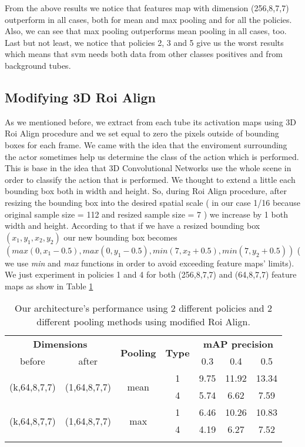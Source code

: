 From the above results we notice that features map with dimension (256,8,7,7) outperform in all cases, both for mean and max pooling and
for all the policies. Also, we can see that max pooling outperforms mean pooling in all cases, too. Last but not least, we notice that policies
2, 3 and 5 give us the worst results which means that svm needs both data from other classes positives and from background tubes. 

\subsection{Modifying 3D Roi Align}
As we mentioned before, we extract from each tube its activation maps using 3D Roi Align procedure and we set equal to zero the pixels outside
of bounding boxes for each frame. We came with the idea that the enviroment surrounding the actor sometimes help us determine the class
of the action which is performed. This is base in the idea that 3D Convolutional Networks use the whole scene in order to classify the action
that is performed. We thought to extend a little each bounding box both in width and height. So, during Roi Align procedure, after resizing
the bounding box into the desired spatial scale  ( in our case 1/16 because original sample size = 112 and resized sample size = 7 )
we increase by 1 both width and height. According to that if we have a resized bounding box $( x_1,y_1,x_2,y_2) $ our new bounding box becomes
$ (max(0,x_1-0.5),max(0,y_1-0.5),min(7,x_2+0.5),min(7,y_2+0.5)) $ ( we use \textit{ min} and \textit{max} functions in order to avoid exceeding feature maps' limits).
We just experiment in policies 1 and 4 for both (256,8,7,7) and (64,8,7,7) feature maps as show in  Table \ref{table:svm_mod_roialign}


\begin{center}
\begin{longtable}{||c | c | c| c||c c c||}

  \hline
  \multicolumn{2}{||c|}{\textbf{Dimensions}} & \multirow{2}{*}{ \textbf{Pooling}} &\multirow{2}{*}{\textbf{Type}} & \multicolumn{3}{|c||}{\textbf{mAP precision}}\\

   before & after &  {} & {} &  0.3 &  0.4 & 0.5 \\
 \hline   \hline
 \multirow{2}{*}{(k,64,8,7,7)} & \multirow{2}{*}{(1,64,8,7,7)} & \multirow{2}{*}{mean}  & 1 & 9.75 & 11.92 & 13.34 \\
  \cline{4-7}
  {} & {} & {} & 4 &  5.74 &6.62 & 7.59 \\
  \hline
 \multirow{2}{*}{(k,64,8,7,7)} & \multirow{2}{*}{(1,64,8,7,7)} & \multirow{2}{*}{max}  & 1 &  6.46 & 10.26 & 10.83 \\
    \cline{4-7}
  {} & {} & {} & 4 & 4.19 & 6.27 & 7.52 \\
    \cline{4-7}
  \hline
  \caption{Our architecture's performance using 2 different policies and 2 different pooling methods using modified Roi Align.}
  \label{table:svm_mod_roialign}

\end{longtable} 
\end{center}


